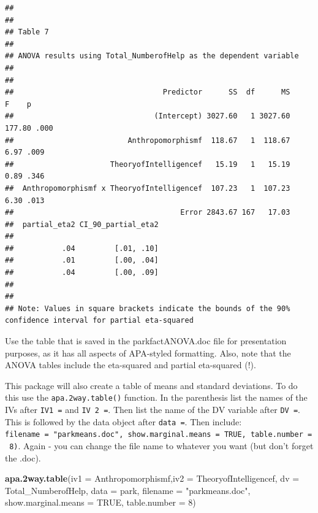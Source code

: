 \documentclass[
]{book}
\newenvironment{Shaded}{\begin{snugshade}}{\end{snugshade}}
\newcommand{\DataTypeTok}[1]{\textcolor[rgb]{0.13,0.29,0.53}{#1}}
\newcommand{\DecValTok}[1]{\textcolor[rgb]{0.00,0.00,0.81}{#1}}
\newcommand{\KeywordTok}[1]{\textcolor[rgb]{0.13,0.29,0.53}{\textbf{#1}}}
\newcommand{\NormalTok}[1]{#1}
\newcommand{\OtherTok}[1]{\textcolor[rgb]{0.56,0.35,0.01}{#1}}
\newcommand{\StringTok}[1]{\textcolor[rgb]{0.31,0.60,0.02}{#1}}
\begin{document}
\begin{verbatim}
## 
## 
## Table 7 
## 
## ANOVA results using Total_NumberofHelp as the dependent variable
##  
## 
##                                  Predictor      SS  df      MS      F    p
##                                (Intercept) 3027.60   1 3027.60 177.80 .000
##                          Anthropomorphismf  118.67   1  118.67   6.97 .009
##                      TheoryofIntelligencef   15.19   1   15.19   0.89 .346
##  Anthropomorphismf x TheoryofIntelligencef  107.23   1  107.23   6.30 .013
##                                      Error 2843.67 167   17.03            
##  partial_eta2 CI_90_partial_eta2
##                                 
##           .04         [.01, .10]
##           .01         [.00, .04]
##           .04         [.00, .09]
##                                 
## 
## Note: Values in square brackets indicate the bounds of the 90% confidence interval for partial eta-squared
\end{verbatim}

Use the table that is saved in the parkfactANOVA.doc file for presentation purposes, as it has all aspects of APA-styled formatting. Also, note that the ANOVA tables include the eta-squared and partial eta-squared (!).

This package will also create a table of means and standard deviations. To do this use the \texttt{apa.2way.table()} function. In the parenthesis list the names of the IVs after \texttt{IV1\ =} and \texttt{IV\ 2\ =}. Then list the name of the DV variable after \texttt{DV\ =}. This is followed by the data object after \texttt{data\ =}. Then include: \texttt{filename\ =\ "parkmeans.doc",\ show.marginal.means\ =\ TRUE,\ table.number\ =\ 8)}. Again - you can change the file name to whatever you want (but don't forget the .doc).

\begin{Shaded}
\begin{Highlighting}[]
\KeywordTok{apa.2way.table}\NormalTok{(}\DataTypeTok{iv1 =}\NormalTok{ Anthropomorphismf,}\DataTypeTok{iv2 =}\NormalTok{ TheoryofIntelligencef, }\DataTypeTok{dv =}\NormalTok{ Total_NumberofHelp, }
               \DataTypeTok{data =}\NormalTok{ park, }
               \DataTypeTok{filename =} \StringTok{"parkmeans.doc"}\NormalTok{, }
               \DataTypeTok{show.marginal.means =} \OtherTok{TRUE}\NormalTok{,}
               \DataTypeTok{table.number =} \DecValTok{8}\NormalTok{)}
\end{Highlighting}
\end{Shaded}
\end{document}
